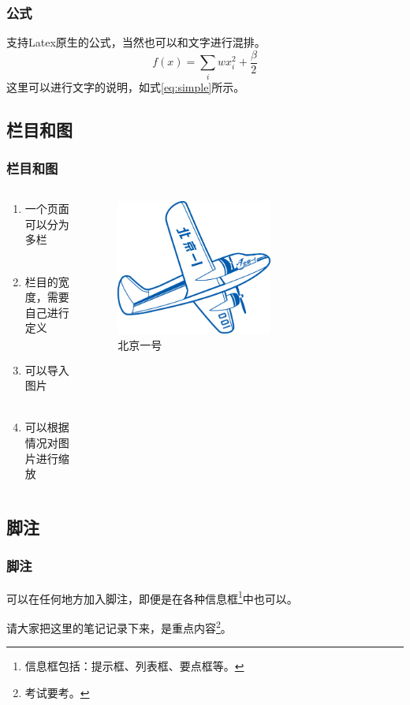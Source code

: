 \documentclass[aspectratio=169,UTF8,t]{beamer}%
\begin{document}
\begin{frame}
\frametitle{公式}
    支持Latex原生的公式，当然也可以和文字进行混排。
    \begin{equation}
        f(x) = \sum_i wx_i^2 + \frac{\beta}{2} \label{eq:simple}  
    \end{equation}
    这里可以进行文字的说明，如式\eqref{eq:simple}所示。
\end{frame}

\subsection{栏目和图}

\begin{frame}
    \frametitle{栏目和图}

    \begin{columns}
        \begin{column}{0.5\textwidth}
            \begin{enumerate}
                \item 一个页面可以分为多栏\\~
                \item 栏目的宽度，需要自己进行定义\\~
                \item 可以导入图片\\~
                \item 可以根据情况对图片进行缩放
            \end{enumerate}
        \end{column}
        \begin{column}{0.4\textwidth}
            \centering
            \begin{figure}
                \centering
                \includegraphics[width=0.6\textwidth]{figs/bj001.png}
                    \caption{北京一号}
                    \label{fig1}
            \end{figure}
            
        \end{column}
    \end{columns}
\end{frame}

\subsection{脚注}

\begin{frame}
    \frametitle{脚注}
        可以在任何地方加入脚注，即便是在各种信息框\footnote{信息框包括：提示框、列表框、要点框等。}中也可以。
        \begin{notebox}[笔记]
            请大家把这里的笔记记录下来，是重点内容\footnote{考试要考。}。 
        \end{notebox}
\end{frame}

\makelast
\end{document}
